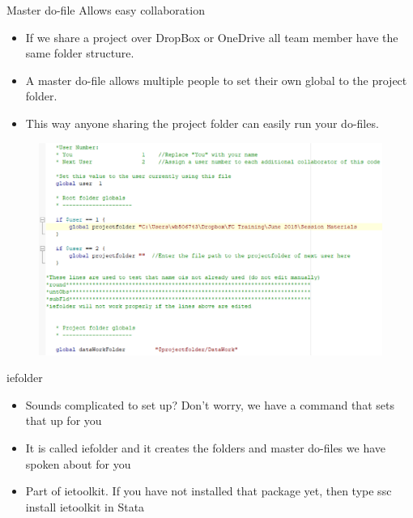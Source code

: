 \documentclass[aspectratio=169]{beamer}
\begin{document}
\begin{frame}[fragile]{Master do-file \newline Allows easy collaboration}
\begin{multicols}{2}	
	\begin{itemize}
		\item If we share a project over DropBox or OneDrive all team member have the same folder structure.
		
		\item A master do-file allows multiple people to set their own global to the project folder.
		
		\item This way anyone sharing the project folder can easily run your do-files.
		
	\end{itemize}
	\begin{figure}
		\centering
		\includegraphics[width=\linewidth]{img/master2}
	\end{figure}
\end{multicols}
\end{frame}


\begin{frame}{iefolder}
\begin{itemize}
	\item Sounds complicated to set up? Don’t worry, we have a command that sets that up for you
	\item It is called iefolder and it creates the folders and master do-files we have spoken about for you
	\item Part of ietoolkit. If you have not installed that package yet, then type ssc install ietoolkit in Stata
\end{itemize}
\end{frame}
\end{document}

